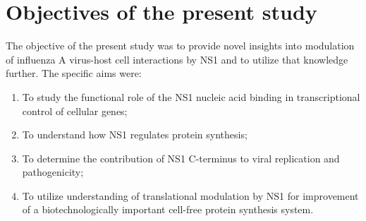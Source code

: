 \newpage
\section{Objectives of the present study}

The objective of the present study was to provide novel insights into modulation of influenza A virus-host cell interactions by NS1 and to utilize that knowledge further. The specific aims were:

	\begin{enumerate}
		\item To study the functional role of the NS1 nucleic acid binding in transcriptional control of cellular genes;
		
		\item To understand how NS1 regulates protein synthesis;
		
		\item To determine the contribution of NS1 C-terminus to viral replication and pathogenicity;
		
		\item To utilize understanding of translational modulation by NS1 for improvement of a biotechnologically important cell-free protein synthesis system.
		
	\end{enumerate}